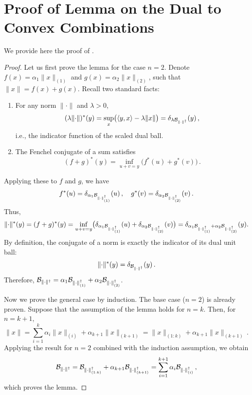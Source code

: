 \documentclass[pmlr]{jmlr}%
\newcommand{\norm}[1]{\lVert #1\rVert}
\begin{document}
 \section{Proof of Lemma on the Dual to Convex Combinations}\label{sec:proof_dual_conv_comb}
 
 We provide here the proof of .
 
 \begin{proof}
   Let us first prove the lemma for the case $n = 2$. Denote $f(x) = \alpha_1 \norm{x}_{(1)}$ and $g(x) = \alpha_2 \norm{x}_{(2)}$, such that $\norm{x} = f(x) + g(x)$. Recall two standard facts:
   \begin{enumerate}
     \item For any norm $\norm{\cdot}$ and $\lambda>0$,
           \[
             (\lambda \norm{\cdot})^*(y) =
             \sup_{x}\bigl( \langle y,x \rangle - \lambda \norm{x}\bigr)
             = \delta_{\lambda \cB_{\norm{\cdot}^\dagger}}(y)\,,
           \]
           i.e., the indicator function of the scaled dual ball.
     \item The Fenchel conjugate of a sum satisfies
           \[
             (f+g)^*(y) = \inf_{u+v=y} \bigl(f^*(u) + g^*(v)\bigr)\,.
           \]
   \end{enumerate}
   Applying these to $f$ and $g$, we have
   \[
     f^*(u) = \delta_{\alpha_1 \cB_{\norm{\cdot}_{(1)}^\dagger}}(u)\,,
     \quad
     g^*(v) = \delta_{\alpha_2 \cB_{\norm{\cdot}_{(2)}^\dagger}}(v)\,.
   \]
   Thus,
   \[
     \norm{\cdot}^*(y)
     = (f+g)^*(y)
     = \inf_{u+v=y}
     \bigl(
     \delta_{\alpha_1 \cB_{\norm{\cdot}_{(1)}^\dagger}}(u)
     +
     \delta_{\alpha_2 \cB_{\norm{\cdot}_{(2)}^\dagger}}(v)
     \bigr)
     =
     \delta_{\alpha_1 \cB_{\norm{\cdot}_{(1)}^\dagger}+\alpha_2 \cB_{\norm{\cdot}_{(2)}^\dagger}}(y).
   \]
   By definition, the conjugate of a norm is exactly the indicator of its dual unit ball:
   \[
   \norm{\cdot}^*(y) = \delta_{\cB_{\norm{\cdot}^\dagger}}(y)\,.
   \]
   Therefore, $\cB_{\norm{\cdot}^\dagger} = \alpha_1 \cB_{\norm{\cdot}_{(1)}^\dagger} + \alpha_2 \cB_{\norm{\cdot}_{(2)}^\dagger}$.
 
   Now we prove the general case by induction. The base case ($n=2$) is already proven. Suppose that the assumption of the lemma holds for $n = k$. Then, for $n = k + 1$,
   \[
   \norm{x} = \sum_{i = 1}^k \alpha_i \norm{x}_{(i)} + \alpha_{k + 1}\norm{x}_{(k + 1)} = \norm{x}_{(1:k)} + \alpha_{k + 1}\norm{x}_{(k + 1)}\,.
   \]
   Applying the result for $n=2$ combined with the induction assumption, we obtain
   \[
   \cB_{\norm{\cdot}^\dagger} = \cB_{\norm{\cdot}_{(1:k)}^\dagger} + \alpha_{k + 1} \cB_{\norm{\cdot}_{(k + 1)}^\dagger} = \sum_{i = 1}^{k + 1} \alpha_i \cB_{\norm{\cdot}_{(i)}^\dagger}\,,
   \]
   which proves the lemma.
 \end{proof}
 
\end{document}
